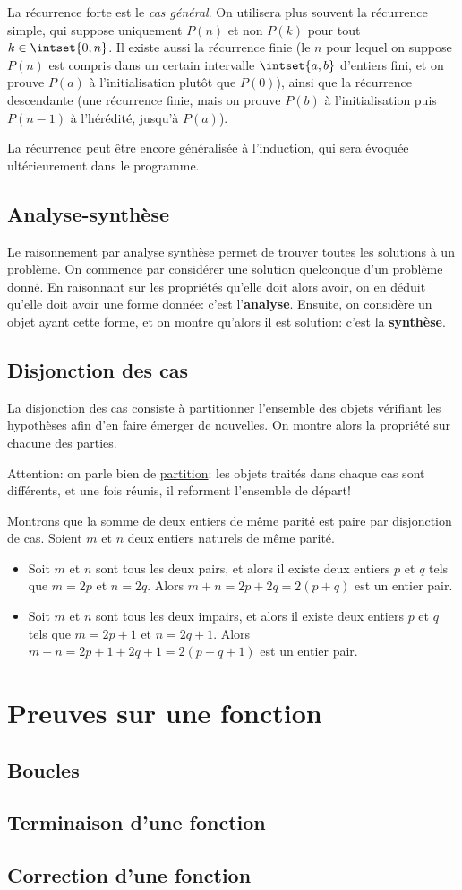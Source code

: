 \documentclass{scrartcl}
\begin{document}
			\rem La récurrence forte est le \textsl{cas général}. 
			On utilisera plus souvent la récurrence simple, 
			qui suppose uniquement $P(n)$ et non $P(k)$ pour tout $k \in \intset{0,n}$.
			Il existe aussi la récurrence finie 
			(le $n$ pour lequel on suppose $P(n)$ est compris dans un certain intervalle $\intset{a,b}$ d'entiers fini, 
			et on prouve $P(a)$ à l'initialisation plutôt que $P(0)$), 
			ainsi que la récurrence descendante 
			(une récurrence finie, mais on prouve $P(b)$ à l'initialisation
			puis $P(n-1)$ à l'hérédité, jusqu'à $P(a)$).

			\rem La récurrence peut être encore généralisée à l'induction, qui sera évoquée ultérieurement dans le programme.

		\subsection{Analyse-synthèse}
			Le raisonnement par analyse synthèse permet de trouver toutes les solutions à un problème.
			On commence par considérer une solution quelconque d'un problème donné. 
			En raisonnant sur les propriétés qu'elle doit alors avoir, on en déduit qu'elle doit avoir une forme donnée: 
			c'est l'\textbf{analyse}. Ensuite, on considère un objet ayant cette forme, et on montre qu'alors il est solution:
			c'est la \textbf{synthèse}.

		\subsection{Disjonction des cas}
			La disjonction des cas consiste à partitionner l'ensemble des objets vérifiant les hypothèses afin d'en faire
			émerger de nouvelles. On montre alors la propriété sur chacune des parties.

			\rem Attention: on parle bien de \underline{partition}: les objets traités dans chaque cas sont différents,
			et une fois réunis, il reforment l'ensemble de départ!

			\exemple Montrons que la somme de deux entiers de même parité est paire par disjonction de cas.
			Soient $m$ et $n$ deux entiers naturels de même parité.
			\begin{itemize}
				\item Soit $m$ et $n$ sont tous les deux pairs, et alors il existe deux entiers $p$ et $q$
				tels que $m=2p$ et $n=2q$. Alors $m+n = 2p+2q = 2(p+q)$ est un entier pair.
				\item Soit $m$ et $n$ sont tous les deux impairs, et alors il existe deux entiers $p$ et $q$
				tels que $m=2p+1$ et $n=2q+1$. Alors $m+n = 2p+1+2q+1 = 2(p+q+1)$ est un entier pair.
			\end{itemize}

	\section{Preuves sur une fonction}
		\subsection{Boucles}
		\subsection{Terminaison d'une fonction}
		\subsection{Correction d'une fonction}
\end{document}

